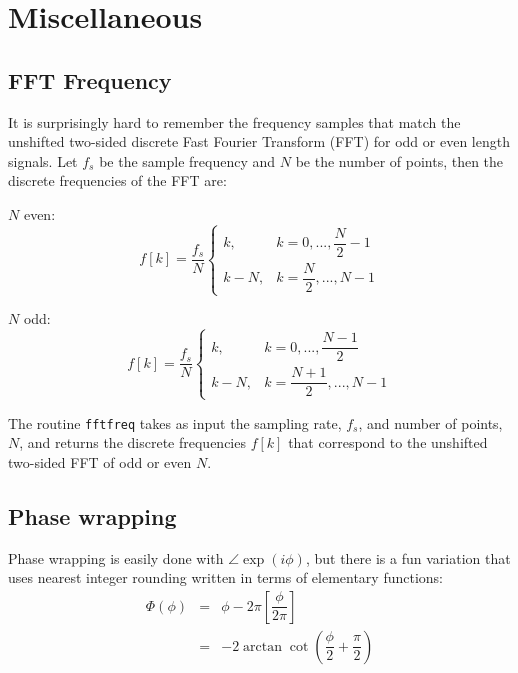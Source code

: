 

\section{Miscellaneous}

\subsection{FFT Frequency}

It is surprisingly hard to remember the frequency samples that match the unshifted two-sided discrete Fast Fourier Transform (FFT) for odd or even length signals. Let $f_s$ be the sample frequency and $N$ be the number of points, then the discrete frequencies of the FFT are:

$N$ even:
\begin{equation}
f[k] = \dfrac{f_s}{N}\begin{cases}
    k,& k = 0,..., \dfrac{N}{2} - 1\\
    k-N, & k = \dfrac{N}{2}, ..., N-1 
\end{cases}
\end{equation}

$N$ odd:
\begin{equation}
f[k] = \dfrac{f_s}{N}\begin{cases}
    k,& k = 0,..., \dfrac{N-1}{2} \\
    k-N, & k = \dfrac{N+1}{2}, ..., N-1 
\end{cases}
\end{equation}

The routine \texttt{fftfreq} takes as input the sampling rate, $f_s$, and number of points, $N$, and returns the discrete frequencies $f[k]$ that correspond to the unshifted two-sided FFT of odd or even $N$.

{\footnotesize
{}
}



\subsection{Phase wrapping}

Phase wrapping is easily done with $\angle \exp(i\phi)$, but there is a fun variation that uses nearest integer rounding written in terms of elementary functions: 
\begin{eqnarray}
\Phi(\phi) & = & \phi - 2\pi\left[\dfrac{\phi}{2\pi} \right] \\
\ & = & -2\arctan\cot\left(\dfrac{\phi}{2} + \dfrac{\pi}{2}\right) 
\end{eqnarray} 

